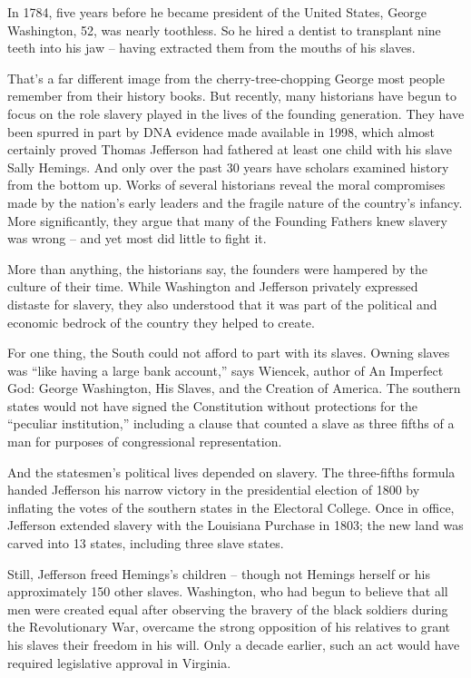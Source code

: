 In 1784, five years before he became president of the United States, George Washington, 52, was nearly toothless. So he hired a dentist to transplant nine teeth into his jaw – having extracted them from the mouths of his slaves.


That's a far different image from the cherry-tree-chopping George most people remember from their history books. But recently, many historians have begun to focus on the role slavery played in the lives of the founding generation. They have been spurred in part by DNA evidence made available in 1998, which almost certainly proved Thomas Jefferson had fathered at least one child with his slave Sally Hemings. And only over the past 30 years have scholars examined history from the bottom up. Works of several historians reveal the moral compromises made by the nation's early leaders and the fragile nature of the country's infancy. More significantly, they argue that many of the Founding Fathers knew slavery was wrong – and yet most did little to fight it.


More than anything, the historians say, the founders were hampered by the culture of their time. While Washington and Jefferson privately expressed distaste for slavery, they also understood that it was part of the political and economic bedrock of the country they helped to create.


For one thing, the South could not afford to part with its slaves. Owning slaves was ``like having a large bank account,'' says Wiencek, author of An Imperfect God: George Washington, His Slaves, and the Creation of America. The southern states would not have signed the Constitution without protections for the ``peculiar institution,'' including a clause that counted a slave as three fifths of a man for purposes of congressional representation.


And the statesmen's political lives depended on slavery. The three-fifths formula handed Jefferson his narrow victory in the presidential election of 1800 by inflating the votes of the southern states in the Electoral College. Once in office, Jefferson extended slavery with the Louisiana Purchase in 1803; the new land was carved into 13 states, including three slave states.


Still, Jefferson freed Hemings's children – though not Hemings herself or his approximately 150 other slaves. Washington, who had begun to believe that all men were created equal after observing the bravery of the black soldiers during the Revolutionary War, overcame the strong opposition of his relatives to grant his slaves their freedom in his will. Only a decade earlier, such an act would have required legislative approval in Virginia.